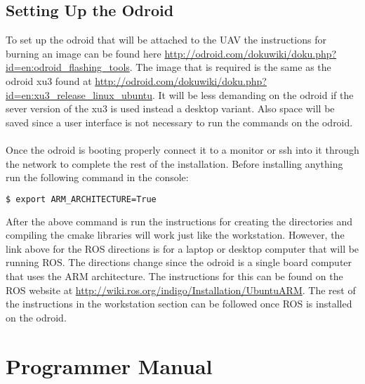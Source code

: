 \subsection{Setting Up the Odroid}
To set up the odroid that will be attached to the UAV the instructions for burning an image can be found here \url{http://odroid.com/dokuwiki/doku.php?id=en:odroid_flashing_tools}. The image that is required is the same as the odroid xu3 found at \url{http://odroid.com/dokuwiki/doku.php?id=en:xu3_release_linux_ubuntu}. It will be less demanding on the odroid if the sever version of the xu3 is used instead a desktop variant. Also space will be saved since a user interface is not necessary to run the commands on the odroid.\\
\\
Once the odroid is booting properly connect it to a monitor or ssh into it through the network to complete the rest of the installation. Before installing anything run the following command in the console:
\begin{lstlisting}[language=bash]
$ export ARM_ARCHITECTURE=True
\end{lstlisting}
After the above command is run the instructions for creating the directories and compiling the cmake libraries will work just like the workstation. However, the link above for the ROS directions is for a laptop or desktop computer that will be running ROS. The directions change since the odroid is a single board computer that uses the ARM architecture. The instructions for this can be found on the ROS website at \url{http://wiki.ros.org/indigo/Installation/UbuntuARM}. The rest of the instructions in the workstation section can be followed once ROS is installed on the odroid.

\section{Programmer Manual}


